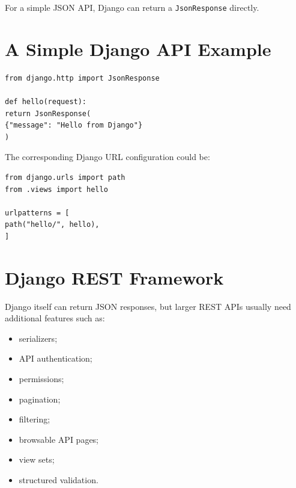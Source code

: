\documentclass[a4paper]{article}
\begin{document}
        For a simple JSON API, Django can return a \texttt{JsonResponse} directly.
    
    
    \section*{A Simple Django API Example}
        
        \begin{verbatim}
from django.http import JsonResponse

def hello(request):
return JsonResponse(
{"message": "Hello from Django"}
)
        \end{verbatim}
        
        The corresponding Django URL configuration could be:
        
        \begin{verbatim}
from django.urls import path
from .views import hello

urlpatterns = [
path("hello/", hello),
]
        \end{verbatim}
    
    
    \section*{Django REST Framework}
        
        Django itself can return JSON responses, but larger REST APIs usually
        need additional features such as:
        
        \begin{itemize}
            \item serializers;
            \item API authentication;
            \item permissions;
            \item pagination;
            \item filtering;
            \item browsable API pages;
            \item view sets;
            \item structured validation.
        \end{itemize}
        
\end{document}
